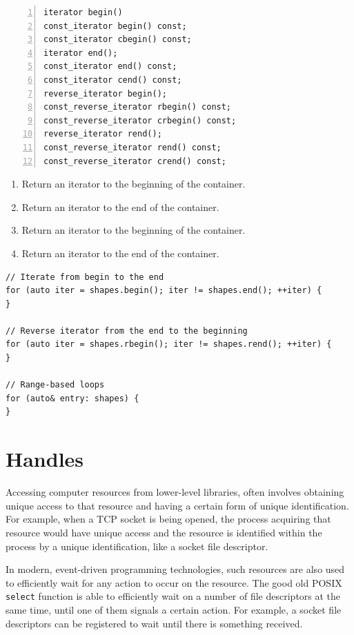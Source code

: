 \documentclass[10pt,a4paper,openany]{mudbook}
\makeatletter
\newcommand{\indextt}[2][]{\texttt{#2}\index{#2@\texttt{#2}#1}}
\newenvironment{enumeratedef}
  {\begin{enumerate}[topsep=0.5em,itemsep=0em,parsep=0em,font=\small]
     \small}
  {\end{enumerate}}
\makeatother
\begin{document}
\begin{lstlisting}[style=definition,numbers=left]
iterator begin()
const_iterator begin() const;
const_iterator cbegin() const;
iterator end();
const_iterator end() const;
const_iterator cend() const;
reverse_iterator begin();
const_reverse_iterator rbegin() const;
const_reverse_iterator crbegin() const;
reverse_iterator rend();
const_reverse_iterator rend() const;
const_reverse_iterator crend() const;
\end{lstlisting}
\begin{enumeratedef}
  \item[1-3] Return an iterator to the beginning of the container.
  \item[4-6] Return an iterator to the end of the container.
  \item[7-9] Return an iterator to the beginning of the container.
  \item[10-12] Return an iterator to the end of the container.
\end{enumeratedef}

\begin{lstlisting}[style=snippet]
// Iterate from begin to the end
for (auto iter = shapes.begin(); iter != shapes.end(); ++iter) {
}

// Reverse iterator from the end to the beginning
for (auto iter = shapes.rbegin(); iter != shapes.rend(); ++iter) {
}

// Range-based loops
for (auto& entry: shapes) {
}
\end{lstlisting}


\chapter{Handles}
\label{chp:handles}

Accessing computer resources from lower-level libraries, often involves
obtaining unique access to that resource and having a certain form of
unique identification. For example, when a TCP socket is being opened, the
process acquiring that resource would have unique access and the resource
is identified within the process by a unique identification, like a socket
file descriptor.

In modern, event-driven programming technologies, such resources are also
used to efficiently wait for any action to occur on the resource. The good
old POSIX \indextt{select} function is able to efficiently wait on a number
of file descriptors at the same time, until one of them signals a certain
action. For example, a socket file descriptors can be registered to wait
until there is something received.
\end{document}
